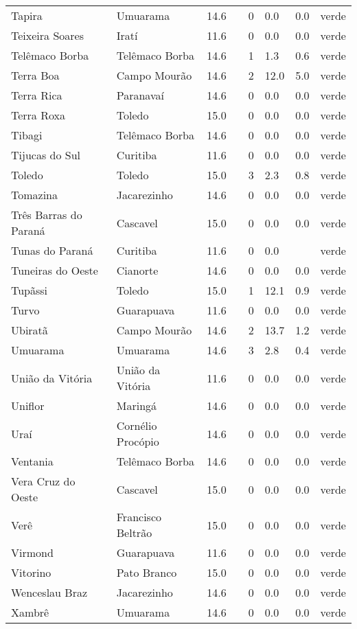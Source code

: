 \begin{longtable}{l|lllllll}
  Tapira & Umuarama & 14.6 &  & 0 & 0.0 & 0.0 & verde \\ 
  Teixeira Soares & Iratí & 11.6 &  & 0 & 0.0 & 0.0 & verde \\ 
  Telêmaco Borba & Telêmaco Borba & 14.6 &  & 1 & 1.3 & 0.6 & verde \\ 
  Terra Boa & Campo Mourão & 14.6 &  & 2 & 12.0 & 5.0 & verde \\ 
  Terra Rica & Paranavaí & 14.6 &  & 0 & 0.0 & 0.0 & verde \\ 
  Terra Roxa & Toledo & 15.0 &  & 0 & 0.0 & 0.0 & verde \\ 
  Tibagi & Telêmaco Borba & 14.6 &  & 0 & 0.0 & 0.0 & verde \\ 
  Tijucas do Sul & Curitiba & 11.6 &  & 0 & 0.0 & 0.0 & verde \\ 
  Toledo & Toledo & 15.0 &  & 3 & 2.3 & 0.8 & verde \\ 
  Tomazina & Jacarezinho & 14.6 &  & 0 & 0.0 & 0.0 & verde \\ 
  Três Barras do Paraná & Cascavel & 15.0 &  & 0 & 0.0 & 0.0 & verde \\ 
  Tunas do Paraná & Curitiba & 11.6 &  & 0 & 0.0 &  & verde \\ 
  Tuneiras do Oeste & Cianorte & 14.6 &  & 0 & 0.0 & 0.0 & verde \\ 
  Tupãssi & Toledo & 15.0 &  & 1 & 12.1 & 0.9 & verde \\ 
  Turvo & Guarapuava & 11.6 &  & 0 & 0.0 & 0.0 & verde \\ 
  Ubiratã & Campo Mourão & 14.6 &  & 2 & 13.7 & 1.2 & verde \\ 
  Umuarama & Umuarama & 14.6 &  & 3 & 2.8 & 0.4 & verde \\ 
  União da Vitória & União da Vitória & 11.6 &  & 0 & 0.0 & 0.0 & verde \\ 
  Uniflor & Maringá & 14.6 &  & 0 & 0.0 & 0.0 & verde \\ 
  Uraí & Cornélio Procópio & 14.6 &  & 0 & 0.0 & 0.0 & verde \\ 
  Ventania & Telêmaco Borba & 14.6 &  & 0 & 0.0 & 0.0 & verde \\ 
  Vera Cruz do Oeste & Cascavel & 15.0 &  & 0 & 0.0 & 0.0 & verde \\ 
  Verê & Francisco Beltrão & 15.0 &  & 0 & 0.0 & 0.0 & verde \\ 
  Virmond & Guarapuava & 11.6 &  & 0 & 0.0 & 0.0 & verde \\ 
  Vitorino & Pato Branco & 15.0 &  & 0 & 0.0 & 0.0 & verde \\ 
  Wenceslau Braz & Jacarezinho & 14.6 &  & 0 & 0.0 & 0.0 & verde \\ 
  Xambrê & Umuarama & 14.6 &  & 0 & 0.0 & 0.0 & verde \\ 
  \hline
\end{longtable}
